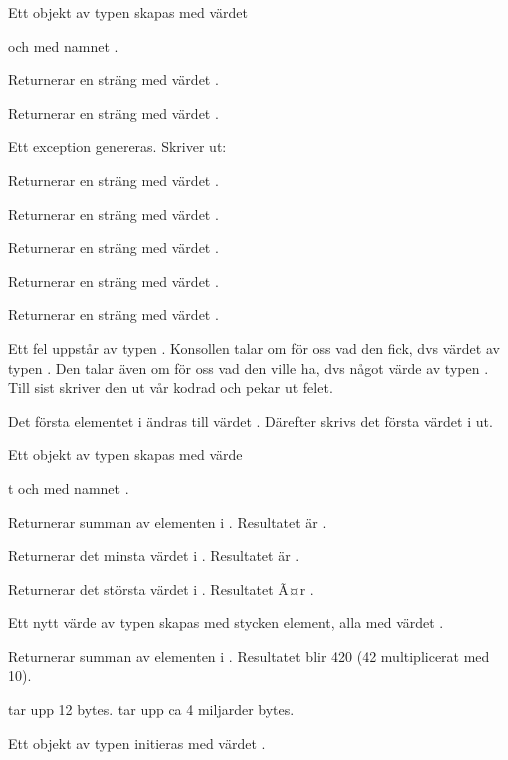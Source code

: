 \Subtask Ett objekt av typen  skapas med värdet 

 och med namnet .

\Subtask Returnerar en sträng med värdet .

\Subtask Returnerar en sträng med värdet \code{!}.

\Subtask Ett exception genereras. Skriver ut:


\Subtask Returnerar en sträng med värdet .

\Subtask Returnerar en sträng med värdet .

\Subtask Returnerar en sträng med värdet .

\Subtask Returnerar en sträng med värdet .

\Subtask Returnerar en sträng med värdet .

\Subtask Ett fel uppstår av typen . Konsollen talar om för oss vad den fick, dvs värdet  av typen . Den talar även om för oss vad den ville ha, dvs något värde av typen . Till sist skriver den ut vår kodrad och pekar ut felet.

\Subtask Det första elementet i  ändras till värdet . Därefter skrivs det första värdet i  ut.

\Subtask Ett objekt av typen  skapas med värde

t  och med namnet .

\Subtask Returnerar summan av elementen i . Resultatet är .

\Subtask Returnerar det minsta värdet i . Resultatet är .

\Subtask Returnerar det största värdet i . Resultatet Ã¤r .

\Subtask Ett nytt värde av typen  skapas med  stycken element, alla med värdet .

\Subtask Returnerar summan av elementen i . Resultatet blir 420 (42 multiplicerat med 10).

\Subtask {} tar upp 12 bytes.  tar upp ca 4 miljarder bytes.

\Task 

\Subtask Ett objekt av typen  initieras med värdet .

